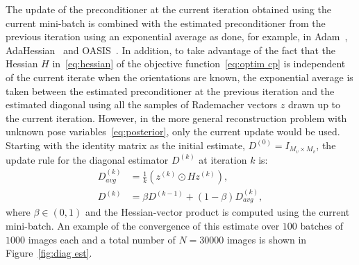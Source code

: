 \documentclass{article}
\begin{document}
The update of the preconditioner at the current iteration obtained using the current 
mini-batch is combined with the estimated preconditioner from the previous iteration 
using an exponential average as done, for example, in Adam~\cite{kingma_adam_2015}, 
AdaHessian~\cite{yao_adahessian_2021} and OASIS~\cite{jahani_doubly_2022}.
In addition, to take advantage of the fact that the Hessian $H$ in~\eqref{eq:hessian}
of the objective function~\eqref{eq:optim cp} is independent of the current 
iterate when the orientations are known, the exponential average is taken between 
the estimated preconditioner at the previous iteration and the estimated diagonal 
using all the samples of Rademacher vectors $z$ drawn up to the current iteration. 
However, in the more general reconstruction problem with unknown pose 
variables~\eqref{eq:posterior}, only the current update would be used.
Starting with the identity matrix as the initial estimate, $D^{(0)} = I_{M_v \times M_v}$, 
the update rule for the diagonal estimator $D^{(k)}$ at iteration $k$ is:
\begin{subequations}
    \begin{align}
        D_{avg}^{(k)} &= \frac{1}{k}\left( z^{(k)} \odot Hz^{(k)}\right),
        \label{eq:hutch update}
        \\
        D^{(k)} &= \beta D^{(k-1)} + (1-\beta) D_{avg}^{(k)},
        \label{eq:exp avg update}
    \end{align}
    \label{eq:diag est rule}
\end{subequations}
where $\beta \in (0,1)$ and the Hessian-vector product is computed using the 
current mini-batch. 
An example of the convergence of this estimate over $100$ batches of $1000$ images 
each and a total number of $N=30000$ images is shown in Figure~\ref{fig:diag est}.
\end{document}
